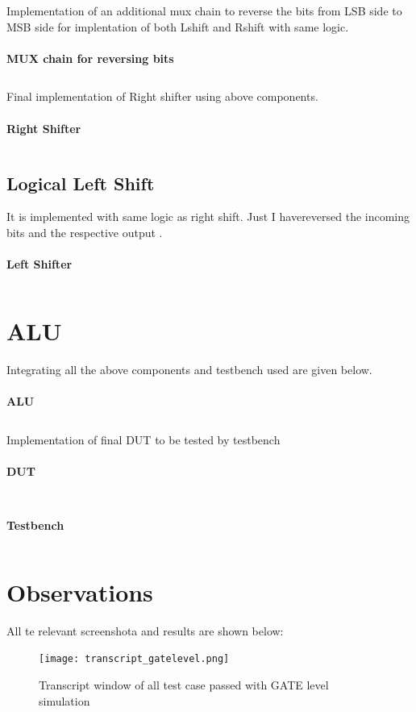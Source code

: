 \documentclass[12pt]{article}
\begin{document}
\noindent Implementation of an additional mux chain to reverse the bits from LSB side to MSB side for implentation of both Lshift and Rshift with same logic.\\ \\
\textbf{MUX chain for reversing bits } 
\inputminted[fontsize=\footnotesize,linenos,frame=lines
]{VHDL}{mux_change.vhd}

\noindent Final implementation of Right shifter using above components.\\ \\
\textbf{Right Shifter } 
\inputminted[fontsize=\footnotesize,linenos,frame=lines
]{VHDL}{Rshift.vhd}

\subsection{Logical Left Shift}
It is implemented with same logic as right shift. Just I havereversed the incoming bits and the respective output .
\\ \\
\textbf{Left Shifter } 
\inputminted[fontsize=\footnotesize,linenos,frame=lines
]{VHDL}{Lshift.vhd}

\section {ALU}
Integrating all the above components and testbench used are given below.\\
\\
\textbf{ALU } 
\inputminted[fontsize=\footnotesize,linenos,frame=lines
]{VHDL}{alu.vhd}
\noindent Implementation of final DUT to be tested by testbench \\ 
\\  \noindent \textbf{DUT } 
\inputminted[fontsize=\footnotesize,linenos,frame=lines
]{VHDL}{DUT.vhd}

\\  \noindent \textbf{Testbench } 
\inputminted[fontsize=\footnotesize,linenos,frame=lines
]{VHDL}{Testbench.vhd}


\section{Observations}
All te relevant screenshota and results are shown below:\\
\begin{figure}[H]
\begin{center}
\texttt{[image: transcript\_gatelevel.png]}
\caption{Transcript window of all test case passed with GATE level simulation}
\end{center}
\end{figure}
 
\end{document}
